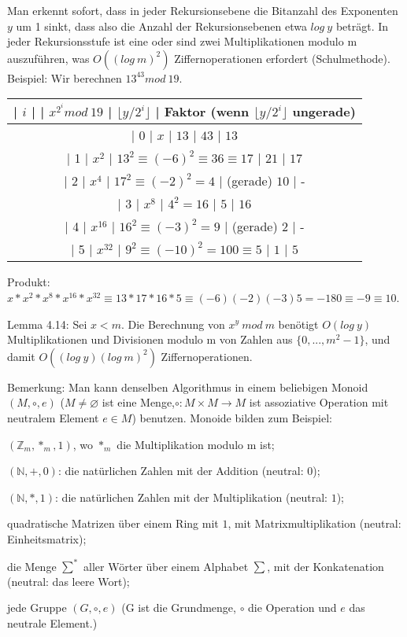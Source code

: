 \documentclass[a4paper]{article}
\begin{document}
\begin{multicols}{3}
    Man erkennt sofort, dass in jeder Rekursionsebene die Bitanzahl des Exponenten $y$ um 1 sinkt, dass also die Anzahl der Rekursionsebenen etwa $log\ y$ beträgt. In jeder Rekursionsstufe ist eine oder sind zwei Multiplikationen modulo m auszuführen, was $O((log\ m)^2)$ Ziffernoperationen erfordert (Schulmethode).
    Beispiel: Wir berechnen $13^{43} mod\ 19$.
    \begin{tabular}{c}
        | $i$ |     | $x^{2^i} mod\ 19$            | $\lfloor y/2^i\rfloor$ | Faktor (wenn $\lfloor y/2^i\rfloor$ ungerade) \\\hline
        | 0  | $x$   | $13$                  | $43$          | $13$                                                         \\
        | 1  | $x^2$  | $13^2 \equiv (-6)^2 \equiv 36\equiv 17$ | $21$          | $17$                                      \\
        | 2  | $x^4$  | $17^2 \equiv (-2)^2 = 4$        | (gerade) $10$     | -                                             \\
        | 3  | $x^8$  | $4^2 = 16$               | $5$          | $16$                                                      \\
        | 4  | $x^{16}$ | $16^2 \equiv (-3)^2 = 9$        | (gerade) $2$      | -                                           \\
        | 5  | $x^{32}$ | $9^2 \equiv (-10)^2 = 100\equiv 5$   | $1$          | $5$
    \end{tabular}

    Produkt: $x*x^2 *x^8 *x^{16} *x^{32} \equiv 13*17*16*5\equiv (-6)(-2)(-3)5 = -180\equiv -9\equiv 10$.

    Lemma 4.14: Sei $x<m$. Die Berechnung von $x^y\ mod\ m$ benötigt $O(log\ y)$ Multiplikationen und Divisionen modulo m von Zahlen aus $\{0,...,m^2-1\}$, und damit $O((log\ y)(log\ m)^2)$ Ziffernoperationen.

    Bemerkung: Man kann denselben Algorithmus in einem beliebigen Monoid $(M,\circ,e)$ ($M\not=\varnothing$ ist eine Menge,$\circ:M\times M \rightarrow M$ ist assoziative Operation mit neutralem Element $e\in M$) benutzen. Monoide bilden zum Beispiel:
    \begin{itemize*}
        \item $(\mathbb{Z}_m ,*_m,1)$, wo $*_m$ die Multiplikation modulo m ist;
        \item $(\mathbb{N},+,0)$: die natürlichen Zahlen mit der Addition (neutral: $0$);
        \item $(\mathbb{N},*,1)$: die natürlichen Zahlen mit der Multiplikation (neutral: $1$);
        \item quadratische Matrizen über einem Ring mit $1$, mit Matrixmultiplikation (neutral: Einheitsmatrix);
        \item die Menge $\sum^*$ aller Wörter über einem Alphabet $\sum$, mit der Konkatenation (neutral: das leere Wort);
        \item jede Gruppe $(G,\circ,e)$ (G ist die Grundmenge, $\circ$ die Operation und $e$ das neutrale Element.)
    \end{itemize*}


\end{multicols}
\end{document}
